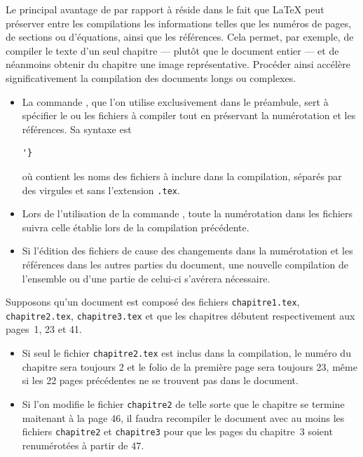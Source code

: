 Le principal avantage de \cmd{} par rapport à \cmd{}
réside dans le fait que {\LaTeX} peut préserver entre les compilations
les informations telles que les numéros de pages, de sections ou
d'équations, ainsi que les références. Cela permet, par exemple, de
compiler le texte d'un seul chapitre --- plutôt que le document entier
--- et de néanmoins obtenir du chapitre une image représentative.
Procéder ainsi accélère significativement la compilation des documents
longs ou complexes.

\begin{itemize}
\item La commande \cmd{}, que l'on utilise exclusivement
  dans le préambule, sert à spécifier le ou les fichiers à compiler
  tout en préservant la numérotation et les références. Sa syntaxe est
\begin{lstlisting}
'}
\end{lstlisting}
  où  contient les noms des fichiers à
  inclure dans la compilation, séparés par des virgules et sans
  l'extension \verb=.tex=.
\item Lors de l'utilisation de la commande \cmd{}, toute
  la numérotation dans les fichiers 
  suivra celle établie lors de la compilation précédente.
\item Si l'édition des fichiers de 
  cause des changements dans la numérotation et les références dans
  les autres parties du document, une nouvelle compilation de
  l'ensemble ou d'une partie de celui-ci s'avérera nécessaire.
\end{itemize}

Supposons qu'un document est composé des fichiers
\verb=chapitre1.tex=, \verb=chapitre2.tex=, \verb=chapitre3.tex= et
que les chapitres débutent respectivement aux pages~1, 23 et 41.
\begin{itemize}
\item Si seul le fichier \verb=chapitre2.tex= est inclus dans la
  compilation, le numéro du chapitre sera toujours 2 et le folio de la
  première page sera toujours 23, même si les 22 pages précédentes ne se
  trouvent pas dans le document.
\item Si l'on modifie le fichier \verb=chapitre2= de telle sorte que
  le chapitre se termine maitenant à la page 46, il faudra recompiler
  le document avec au moins les fichiers \verb=chapitre2=  et
  \verb=chapitre3= pour que les pages du chapitre~3 soient renumérotées
  à partir de 47.
\end{itemize}

